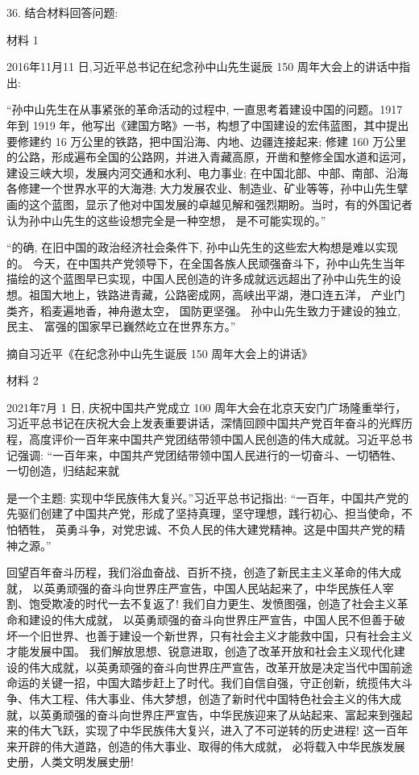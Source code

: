 \documentclass[UTF8,11pt]{ctexart}
\begin{document}
36. 结合材料回答问题:

材料 1

2016年11月11 日,习近平总书记在纪念孙中山先生诞辰 150 周年大会上的讲话中指出:

“孙中山先生在从事紧张的革命活动的过程中, 一直思考着建设中国的问题。1917 年到 1919 年，他写出《建国方略》一书，构想了中国建设的宏伟蓝图，其中提出要修建约 16 万公里的铁路，把中国沿海、内地、边疆连接起来; 修建 160 万公里的公路，形成遍布全国的公路网，并进入青藏高原，开凿和整修全国水道和运河，建设三峡大坝，发展内河交通和水利、电力事业; 在中国北部、中部、南部、沿海各修建一个世界水平的大海港; 大力发展农业、制造业、矿业等等，孙中山先生擘画的这个蓝图，显示了他对中国发展的卓越见解和强烈期盼。当时，有的外国记者认为孙中山先生的这些设想完全是一种空想， 是不可能实现的。”

“的确, 在旧中国的政治经济社会条件下, 孙中山先生的这些宏大构想是难以实现的。 今天，在中国共产党领导下，在全国各族人民顽强奋斗下，孙中山先生当年描绘的这个蓝图早已实现，中国人民创造的许多成就远远超出了孙中山先生的设想。祖国大地上，铁路进青藏，公路密成网，高峡出平湖，港口连五洋， 产业门类齐，稻麦遍地香，神舟遨太空， 国防更坚强。 孙中山先生致力于建设的独立, 民主、 富强的国家早已巍然屹立在世界东方。”

摘自习近平《在纪念孙中山先生诞辰 150 周年大会上的讲话》

材料 2

2021年7月 1 日, 庆祝中国共产党成立 100 周年大会在北京天安门广场隆重举行，习近平总书记在庆祝大会上发表重要讲话，深情回顾中国共产党百年奋斗的光辉历程，高度评价一百年来中国共产党团结带领中国人民创造的伟大成就。习近平总书记强调: “一百年来，中国共产党团结带领中国人民进行的一切奋斗、一切牺牲、一切创造，归结起来就

是一个主题: 实现中华民族伟大复兴。”习近平总书记指出: “一百年，中国共产党的先驱们创建了中国共产党，形成了坚持真理，坚守理想，践行初心、担当使命，不怕牺牲， 英勇斗争，对党忠诚、不负人民的伟大建党精神。这是中国共产党的精神之源。”

回望百年奋斗历程，我们浴血奋战、百折不挠，创造了新民主主义革命的伟大成就， 以英勇顽强的奋斗向世界庄严宣告，中国人民站起来了，中华民族任人宰割、饱受欺凌的时代一去不复返了! 我们自力更生、发愤图强，创造了社会主义革命和建设的伟大成就， 以英勇顽强的奋斗向世界庄严宣告，中国人民不但善于破坏一个旧世界、也善于建设一个新世界，只有社会主义才能救中国，只有社会主义才能发展中国。 我们解放思想、锐意进取，创造了改革开放和社会主义现代化建设的伟大成就，以英勇顽强的奋斗向世界庄严宣告，改革开放是决定当代中国前途命运的关键一招，中国大踏步赶上了时代。我们自信自强，守正创新，统揽伟大斗争、伟大工程、伟大事业、伟大梦想，创造了新时代中国特色社会主义的伟大成就，以英勇顽强的奋斗向世界庄严宣告，中华民族迎来了从站起来、富起来到强起来的伟大飞跃，实现了中华民族伟大复兴，进入了不可逆转的历史进程! 这一百年来开辟的伟大道路，创造的伟大事业、取得的伟大成就， 必将载入中华民族发展史册，人类文明发展史册!
\end{document}
